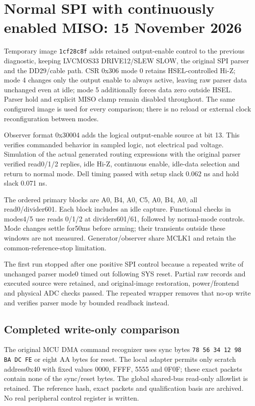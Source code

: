 \clearpage
\section{Normal SPI with continuously enabled MISO: 15 November 2026}
Temporary image \texttt{1cf28c8f} adds retained output-enable control to the
previous diagnostic, keeping LVCMOS33 DRIVE12/SLEW SLOW, the original SPI
parser and the DD29/cable path. CSR 0x306 mode 0 retains HSEL-controlled
Hi-Z; mode 4 changes only the output enable to always active, leaving raw
parser data unchanged even at idle; mode 5 additionally forces data zero
outside HSEL. Parser hold and explicit MISO clamp remain disabled throughout.
The same configured image is used for every comparison; there is no reload
or external clock reconfiguration between modes.

Observer format 0x30004 adds the logical output-enable source at bit 13.
This verifies commanded behavior in sampled logic, not electrical pad voltage.
Simulation of the actual generated routing expressions with the original
parser verified read0/1/2 replies, idle Hi-Z, continuous enable, idle-data
selection and return to normal mode. Dell timing passed with setup slack
0.062 ns and hold slack 0.071 ns.

The ordered primary blocks are A0, B4, A0, C5, A0, B4, A0, all read0/divider601.
Each block includes an idle capture. Functional checks in modes4/5 use reads
0/1/2 at dividers601/61, followed by normal-mode controls. Mode changes settle
for50ms before arming; their transients outside these windows are not measured.
Generator/observer share MCLK1 and retain the common-reference-stop limitation.

The first run stopped after one positive SPI control because a repeated
write of unchanged parser mode0 timed out following SYS reset. Partial raw
records and executed source were retained, and original-image restoration,
power/frontend and physical ADC checks passed. The repeated wrapper removes
that no-op write and verifies parser mode by bounded readback instead.

\subsection{Completed write-only comparison}
The original MCU DMA command recognizer uses sync bytes
\texttt{78 56 34 12 98 BA DC FE} or eight AA bytes for reset.
The local adapter permits only scratch address0x40 with fixed values
0000, FFFF, 5555 and 0F0F; these exact packets contain none of the sync/reset
bytes. The global shared-bus read-only allowlist is retained. The reference
hash, exact packets and qualification basis are archived. No real peripheral
control register is written.

